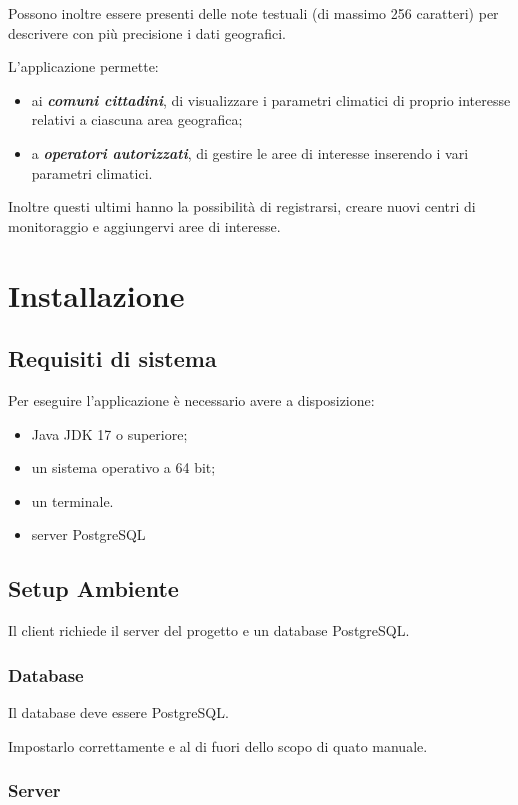 Possono inoltre essere presenti delle note testuali (di massimo 256 caratteri) per descrivere con più precisione i dati geografici.

L'applicazione permette:
\begin{itemize}
	\item ai \textbf{\textsl{comuni cittadini}}, di visualizzare i parametri climatici di proprio interesse relativi a ciascuna area geografica;
	\item a \textbf{\textsl{operatori autorizzati}}, di gestire le aree di interesse inserendo i vari parametri climatici.
\end{itemize}
Inoltre questi ultimi hanno la possibilit\`a di registrarsi, creare nuovi centri di monitoraggio e aggiungervi aree di interesse.

\pagebreak

\chapter{Installazione}
\section{Requisiti di sistema}
Per eseguire l’applicazione \`e necessario avere a disposizione:
\begin{itemize}
	\item Java JDK 17 o superiore;
	\item un sistema operativo a 64 bit;
	\item un terminale.
	\item server PostgreSQL
\end{itemize}

\section{Setup Ambiente}

Il client richiede il server del progetto e un database PostgreSQL.

\subsection{Database}

Il database deve essere PostgreSQL.

Impostarlo correttamente e al di fuori dello scopo di quato manuale.

\subsection{Server}

